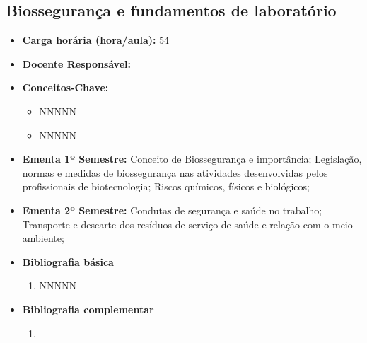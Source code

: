 \documentclass[11pt,fleqn]{book} %
\begin{document}
\subsection{Biossegurança e fundamentos de laboratório}\label{disc:bioseg}
\begin{itemize}
	\item \textbf{Carga horária (hora/aula):} 54
	\item \textbf{Docente Responsável:}
	\item \textbf{Conceitos-Chave:}
	\begin{itemize}
		\item NNNNN
		\item NNNNN
	\end{itemize}
	\item \textbf{Ementa 1º Semestre:} 
	Conceito de Biossegurança e importância; 
	Legislação, normas e medidas de biossegurança nas atividades desenvolvidas pelos profissionais de biotecnologia; 
	Riscos químicos, físicos e biológicos; 
	\item \textbf{Ementa 2º Semestre:} 
	Condutas de segurança e saúde no trabalho; 
	Transporte e descarte dos resíduos de serviço de saúde e relação com o meio ambiente;
	\item \textbf{Bibliografia básica}
	\begin{enumerate}
		\item NNNNN
	\end{enumerate}
	\item \textbf{Bibliografia complementar}
	\begin{enumerate}
		\item 
	\end{enumerate}	
\end{itemize}

\newpage
\end{document}

